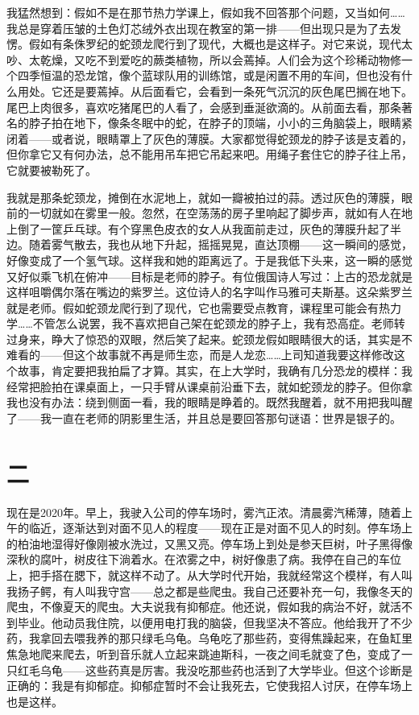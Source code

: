 我猛然想到：假如不是在那节热力学课上，假如我不回答那个问题，又当如何……我总是穿着压皱的土色灯芯绒外衣出现在教室的第一排——但出现只是为了去发愣。假如有条侏罗纪的蛇颈龙爬行到了现代，大概也是这样子。对它来说，现代太吵、太乾燥，又吃不到爱吃的蕨类植物，所以会蔫掉。人们会为这个珍稀动物修一个四季恒温的恐龙馆，像个蓝球队用的训练馆，或是闲置不用的车间，但也没有什么用处。它还是要蔫掉。从后面看它，会看到一条死气沉沉的灰色尾巴搁在地下。尾巴上肉很多，喜欢吃猪尾巴的人看了，会感到垂涎欲滴的。从前面去看，那条著名的脖子拍在地下，像条冬眠中的蛇，在脖子的顶端，小小的三角脑袋上，眼睛紧闭着——或者说，眼睛罩上了灰色的薄膜。大家都觉得蛇颈龙的脖子该是支着的，但你拿它又有何办法，总不能用吊车把它吊起来吧。用绳子套住它的脖子往上吊，它就要被勒死了。 

我就是那条蛇颈龙，摊倒在水泥地上，就如一瓣被拍过的蒜。透过灰色的薄膜，眼前的一切就如在雾里一般。忽然，在空荡荡的房子里响起了脚步声，就如有人在地上倒了一筐乒乓球。有个穿黑色皮衣的女人从我面前走过，灰色的薄膜升起了半边。随着雾气散去，我也从地下升起，摇摇晃晃，直达顶棚——这一瞬间的感觉，好像变成了一个氢气球。这样我和她的距离远了。于是我低下头来，这一瞬的感觉又好似乘飞机在俯冲——目标是老师的脖子。有位俄国诗人写过：上古的恐龙就是这样咀嚼偶尔落在嘴边的紫罗兰。这位诗人的名字叫作马雅可夫斯基。这朵紫罗兰就是老师。假如蛇颈龙爬行到了现代，它也需要受点教育，课程里可能会有热力学……不管怎么说罢，我不喜欢把自己架在蛇颈龙的脖子上，我有恐高症。老师转过身来，睁大了惊恐的双眼，然后笑了起来。蛇颈龙假如眼睛很大的话，其实是不难看的——但这个故事就不再是师生恋，而是人龙恋……上司知道我要这样修改这个故事，肯定要把我拍扁了才算。其实，在上大学时，我确有几分恐龙的模样：我经常把脸拍在课桌面上，一只手臂从课桌前沿垂下去，就如蛇颈龙的脖子。但你拿我也没有办法：绕到侧面一看，我的眼睛是睁着的。既然我醒着，就不用把我叫醒了——我一直在老师的阴影里生活，并且总是要回答那句谜语：世界是银子的。 


\section*{二} 

现在是2020年。早上，我驶入公司的停车场时，雾汽正浓。清晨雾汽稀薄，随着上午的临近，逐渐达到对面不见人的程度——现在正是对面不见人的时刻。停车场上的柏油地湿得好像刚被水洗过，又黑又亮。停车场上到处是参天巨树，叶子黑得像深秋的腐叶，树皮往下淌着水。在浓雾之中，树好像患了病。我停在自己的车位上，把手搭在腮下，就这样不动了。从大学时代开始，我就经常这个模样，有人叫我扬子鳄，有人叫我守宫——总之都是些爬虫。我自己还要补充一句，我像冬天的爬虫，不像夏天的爬虫。大夫说我有抑郁症。他还说，假如我的病治不好，就活不到毕业。他动员我住院，以便用电打我的脑袋，但我坚决不答应。他给我开了不少药，我拿回去喂我养的那只绿毛乌龟。乌龟吃了那些药，变得焦躁起来，在鱼缸里焦急地爬来爬去，听到音乐就人立起来跳迪斯科，一夜之间毛就变了色，变成了一只红毛乌龟——这些药真是厉害。我没吃那些药也活到了大学毕业。但这个诊断是正确的：我是有抑郁症。抑郁症暂时不会让我死去，它使我招人讨厌，在停车场上也是这样。 

